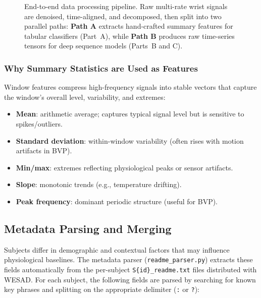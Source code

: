 \documentclass[11pt]{article}
\begin{document}
\begin{figure}[H]
\caption{End-to-end data processing pipeline. Raw multi-rate wrist signals are denoised, time-aligned, and decomposed, then split into two parallel paths: \textbf{Path A} extracts hand-crafted summary features for tabular classifiers (Part~A), while \textbf{Path B} produces raw time-series tensors for deep sequence models (Parts~B and C).}
\label{fig:pipeline}
\end{figure}

\subsubsection{Why Summary Statistics are Used as Features}
Window features compress high-frequency signals into stable vectors that capture the window's overall level, variability, and extremes:
\begin{itemize}
    \item \textbf{Mean}: arithmetic average; captures typical signal level but is sensitive to spikes/outliers.
    \item \textbf{Standard deviation}: within-window variability (often rises with motion artifacts in BVP).
    \item \textbf{Min/max}: extremes reflecting physiological peaks or sensor artifacts.
    \item \textbf{Slope}: monotonic trends (e.g., temperature drifting).
    \item \textbf{Peak frequency}: dominant periodic structure (useful for BVP).
\end{itemize}

\subsection{Metadata Parsing and Merging}
\label{sec:metadata-merge}
Subjects differ in demographic and contextual factors that may influence physiological baselines.
The metadata parser (\texttt{readme\_parser.py}) extracts these fields automatically from the per-subject \texttt{S\{id\}\_readme.txt} files distributed with WESAD.
For each subject, the following fields are parsed by searching for known key phrases and splitting on the appropriate delimiter (\texttt{:} or \texttt{?}):
\end{document}
